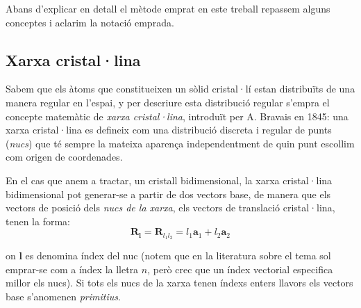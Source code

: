 \documentclass[12pt]{article} %
\let\vec\mathbf %
\begin{document}
Abans d'explicar en detall el mètode emprat en este treball repassem alguns conceptes i aclarim la notació emprada.

\subsection{Xarxa cristal·lina}

Sabem que els àtoms que constitueixen un sòlid cristal·lí estan distribuïts de una manera regular en l'espai, y per descriure esta distribució regular s'empra el concepte matemàtic de \emph{xarxa cristal·lina}, introduït per A. Bravais en 1845: una xarxa cristal·lina es defineix com una distribució discreta i regular de punts (\emph{nucs}) que té sempre la mateixa aparença independentment de quin punt escollim com origen de coordenades.

En el cas que anem a tractar, un cristall bidimensional, la xarxa cristal·lina bidimensional pot generar-se a partir de dos vectors base, de manera que els vectors de posició dels \emph{nucs de la xarxa}, els vectors de translació cristal·lina,  tenen la forma:
\begin{equation}
 \vec R_\vec l=\vec R_{l_1 l_2}=l_1 \vec a_1 +l_2\vec a_2
\end{equation}

on $\vec l$ es denomina índex del nuc (notem que en la literatura sobre el tema sol emprar-se com a índex la lletra $n$, però crec que un índex vectorial especifica millor els nucs). Si tots els nucs de la xarxa tenen índexs enters llavors els vectors base s'anomenen \emph{primitius}.
\end{document}
